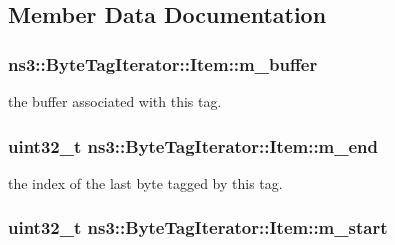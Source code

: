 \subsection{Member Data Documentation}
\subsubsection[{\texorpdfstring{m\+\_\+buffer}{m_buffer}}]{ ns3\+::\+Byte\+Tag\+Iterator\+::\+Item\+::m\+\_\+buffer\hspace{0.3cm}{\ttfamily [private]}}\hypertarget{classns3_1_1ByteTagIterator_1_1Item_a40c345fafbb86c4ee02a023d820d35e5}{}\label{classns3_1_1ByteTagIterator_1_1Item_a40c345fafbb86c4ee02a023d820d35e5}


the buffer associated with this tag. 

\subsubsection[{\texorpdfstring{m\+\_\+end}{m_end}}]{\setlength{\rightskip}{0pt plus 5cm}uint32\+\_\+t ns3\+::\+Byte\+Tag\+Iterator\+::\+Item\+::m\+\_\+end\hspace{0.3cm}{\ttfamily [private]}}\hypertarget{classns3_1_1ByteTagIterator_1_1Item_adb4bd687ba4edee8115c0b3dc36a9c99}{}\label{classns3_1_1ByteTagIterator_1_1Item_adb4bd687ba4edee8115c0b3dc36a9c99}


the index of the last byte tagged by this tag. 

\subsubsection[{\texorpdfstring{m\+\_\+start}{m_start}}]{\setlength{\rightskip}{0pt plus 5cm}uint32\+\_\+t ns3\+::\+Byte\+Tag\+Iterator\+::\+Item\+::m\+\_\+start\hspace{0.3cm}{\ttfamily [private]}}\hypertarget{classns3_1_1ByteTagIterator_1_1Item_a14f4cbbc1aeed825ac56db9a23fce78a}{}\label{classns3_1_1ByteTagIterator_1_1Item_a14f4cbbc1aeed825ac56db9a23fce78a}



